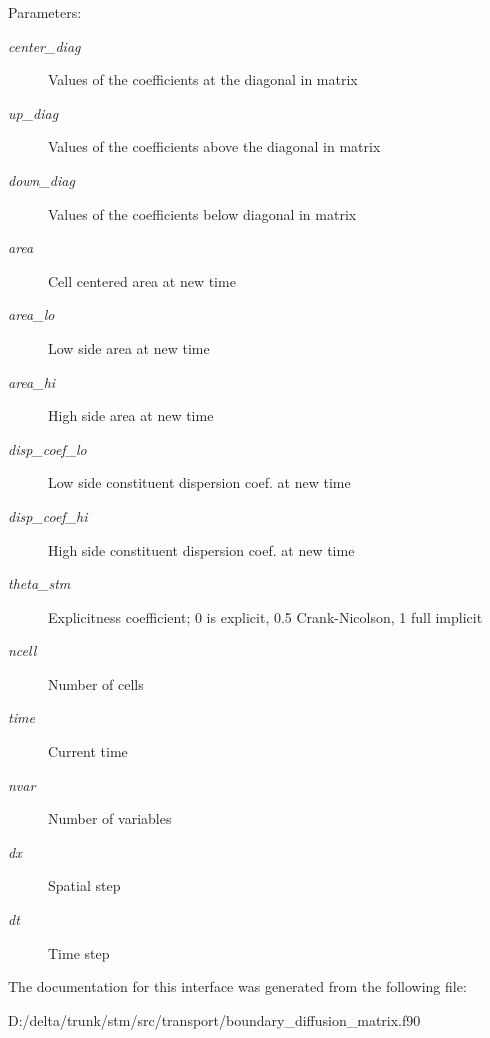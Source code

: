 \begin{Desc}
\item[Parameters:]
\begin{description}
\item[{\em center\_\-diag}]Values of the coefficients at the diagonal in matrix\item[{\em up\_\-diag}]Values of the coefficients above the diagonal in matrix\item[{\em down\_\-diag}]Values of the coefficients below diagonal in matrix\item[{\em area}]Cell centered area at new time \item[{\em area\_\-lo}]Low side area at new time\item[{\em area\_\-hi}]High side area at new time \item[{\em disp\_\-coef\_\-lo}]Low side constituent dispersion coef. at new time\item[{\em disp\_\-coef\_\-hi}]High side constituent dispersion coef. at new time\item[{\em theta\_\-stm}]Explicitness coefficient; 0 is explicit, 0.5 Crank-Nicolson, 1 full implicit \item[{\em ncell}]Number of cells\item[{\em time}]Current time\item[{\em nvar}]Number of variables\item[{\em dx}]Spatial step \item[{\em dt}]Time step \end{description}
\end{Desc}


The documentation for this interface was generated from the following file:\begin{CompactItemize}
\item 
D:/delta/trunk/stm/src/transport/boundary\_\-diffusion\_\-matrix.f90\end{CompactItemize}
